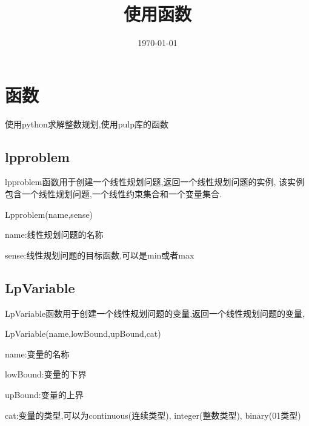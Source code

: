 \documentclass{article}
\begin{document}
\title{使用函数}
\author{}
\date{\today}
\maketitle

\section{函数}
使用python求解整数规划,使用pulp库的函数

\subsection{lpproblem}
lpproblem函数用于创建一个线性规划问题,返回一个线性规划问题的实例,
该实例包含一个线性规划问题,一个线性约束集合和一个变量集合.
\begin{center}
\large Lpproblem(name,sense)
\end{center}
\par name:线性规划问题的名称
\par sense:线性规划问题的目标函数,可以是min或者max

\subsection{LpVariable}
LpVariable函数用于创建一个线性规划问题的变量,返回一个线性规划问题的变量,
\begin{center}
\large LpVariable(name,lowBound,upBound,cat)
\end{center}
\par name:变量的名称
\par lowBound:变量的下界
\par upBound:变量的上界
\par cat:变量的类型,可以为continuous(连续类型), integer(整数类型), binary(01类型)
\end{document}
